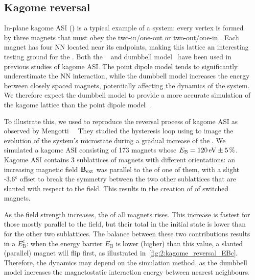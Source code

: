 \subsection{Kagome reversal}
In-plane kagome ASI () is a typical example of a  system: every vertex is formed by three magnets that must obey the two-in/one-out or two-out/one-in .
Each magnet has four NN located near its endpoints, making this lattice an interesting testing ground for the .
Both the ~\cite{Chern2011} and dumbbell model~\cite{Moller2009} have been used in previous studies of kagome ASI.
The point dipole model tends to significantly underestimate the NN interaction, while the dumbbell model increases the  energy between closely spaced magnets, potentially affecting the dynamics of the system.
We therefore expect the dumbbell model to provide a more accurate simulation of the kagome lattice than the point dipole model~\cite{flatspin,mengotti2011kagome}. \par
To illustrate this, we used \hotspice to reproduce the reversal process of kagome ASI as observed by Mengotti~\etal~\cite{mengotti2011kagome}
They studied the hysteresis loop using  to image the evolution of the system's microstate during a gradual increase of the .
We simulated a kagome ASI consisting of 173 magnets whose  $E_\mathrm{B} = \SI{120}{\electronvolt} \pm \SI{5}{\percent}$.
Kagome ASI contains 3 sublattices of magnets with different orientations: an increasing magnetic field $\boldsymbol{\mathbf{B}}_\mathrm{ext}$ was parallel to the  of one of them, with a slight \ang{-3.6} offset to break the symmetry between the two other sublattices that are slanted with respect to the field.
This results in the creation of  of switched magnets. \par
As the field strength increases, the  of all magnets rises.
This increase is fastest for those mostly parallel to the field, but their total  in the initial state is lower than for the other two sublattices.
The balance between these two contributions results in a  $E_\mathrm{B}^\mathrm{c}$: when the energy barrier $E_\mathrm{B}$ is lower (higher) than this value, a slanted (parallel) magnet will flip first, as illustrated in~\cref{fig:2:kagome_reversal_EBc}.
Therefore, the dynamics may depend on the simulation method, as the dumbbell model increases the magnetostatic interaction energy between nearest neighbours.

